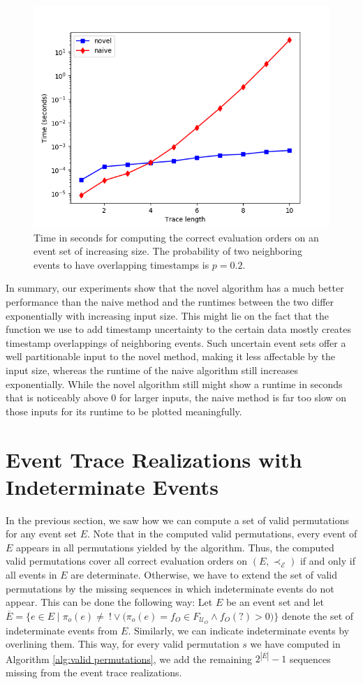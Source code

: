\begin{figure}
	\centering
	\includegraphics[width=0.8\columnwidth]{figures/fixed_p_02_logscale.png}
	\caption{Time in seconds for computing the correct evaluation orders on an event set of increasing size. The probability of two neighboring events to have overlapping timestamps is $p=0.2$.}
	\label{fig: series22}
\end{figure}
%
%
%
%
%
%
%
%

In summary, our experiments show that the novel algorithm has a much better performance than the naive method and the runtimes between the two differ exponentially with increasing input size.
This might lie on the fact that the function we use to add timestamp uncertainty to the certain data mostly creates timestamp overlappings of neighboring events.
Such uncertain event sets offer a well partitionable input to the novel method, making it less affectable by the input size, whereas the runtime of the naive algorithm still increases exponentially.
While the novel algorithm still might show a runtime in seconds that is noticeably above 0 for larger inputs, the naive method is far too slow on those inputs for its runtime to be plotted meaningfully.
%
%
%
%
%
\section{Event Trace Realizations with Indeterminate Events}
In the previous section, we saw how we can compute a set of valid permutations for any event set $E$.
Note that in the computed valid permutations, every event of $E$ appears in all permutations yielded by the algorithm.
Thus, the computed valid permutations cover all correct evaluation orders on $(E, \prec_{\mathcal{E}})$ if and only if all events in $E$ are determinate.
Otherwise, we have to extend the set of valid permutations by the missing sequences in which indeterminate events do not appear.
This can be done the following way:
Let $E$ be an event set and let $\overline{E}=\{e \in E \mid \pi_o(e) \neq  ~! \vee \big( \pi_o(e)=f_O \in F_{\mathcal{U}_O} \wedge f_O(?) > 0 \big)\}$ denote the set of indeterminate events from $E$.
Similarly, we can indicate indeterminate events by overlining them. 
This way, for every valid permutation $s$ we have computed in Algorithm \ref{alg:valid permutations}, we add the remaining $2^{|\overline{E}|} - 1 $ sequences missing from the event trace realizations. \\ 
%

